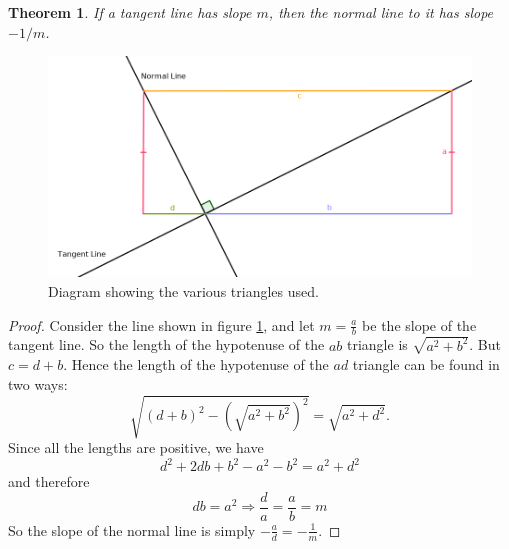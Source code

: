 \documentclass{amsart}
\newtheorem*{thm}{Theorem}
\theoremstyle{definition}
\begin{document}
\begin{thm}
  If a tangent line has slope $ m $, then the normal line to it has slope $ -1/m $.
\end{thm}

\begin{figure}
  \centering
  \includegraphics[width=\textwidth]{normal-line-proof}
  \caption{Diagram showing the various triangles used.}
  \label{fig:normal-line-proof}
\end{figure}

\begin{proof}
  Consider the line shown in figure \ref{fig:normal-line-proof}, and let $ m = \frac{a}{b} $ be the slope of the tangent line.
  So the length of the hypotenuse of the $ ab $ triangle is $ \sqrt{a^2 + b^2} $. But $ c = d + b $. Hence the length
  of the hypotenuse of the $ ad $ triangle can be found in two ways:
  \begin{displaymath}
    \sqrt{(d + b)^2 - \left(\sqrt{a^2 + b^2}\right)^2} = \sqrt{a^2 + d^2}.
  \end{displaymath}
  Since all the lengths are positive, we have
  \begin{displaymath}
    d^2 + 2db + b^2 - a^2 - b^2 = a^2 + d^2
  \end{displaymath}
  and therefore
  \begin{displaymath}
    db = a^2 \Rightarrow \frac{d}{a} = \frac{a}{b} = m
  \end{displaymath}
  So the slope of the normal line is simply $ -\frac{a}{d} = -\frac{1}{m} $.
\end{proof}
\end{document}
